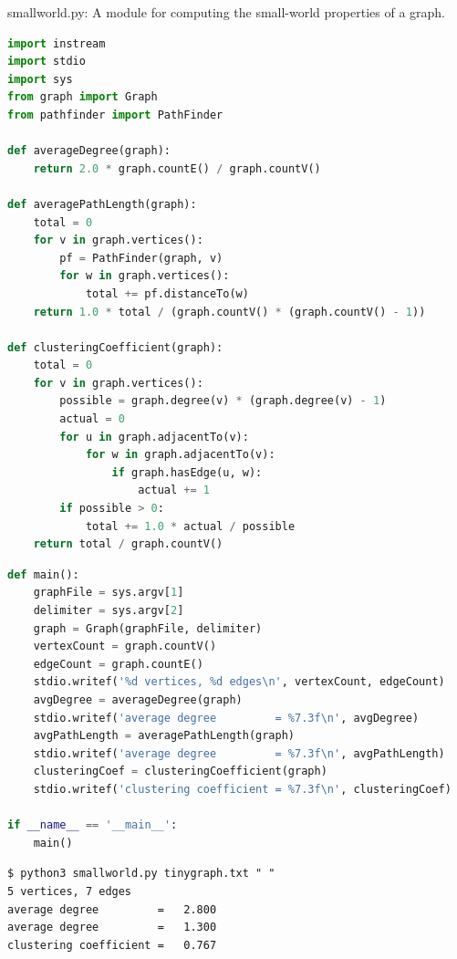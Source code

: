 \documentclass[8pt,a4paper,compress]{beamer}
\begin{document}
\begin{frame}[fragile]
\pause

\begin{framed}
\tiny smallworld.py: A module for computing the small-world properties of a graph.
\end{framed}

\begin{lstlisting}[language=python,style=focusin]
import instream
import stdio
import sys
from graph import Graph
from pathfinder import PathFinder

def averageDegree(graph):
    return 2.0 * graph.countE() / graph.countV()

def averagePathLength(graph):
    total = 0
    for v in graph.vertices():
        pf = PathFinder(graph, v)
        for w in graph.vertices():
            total += pf.distanceTo(w)
    return 1.0 * total / (graph.countV() * (graph.countV() - 1))

def clusteringCoefficient(graph):
    total = 0
    for v in graph.vertices():
        possible = graph.degree(v) * (graph.degree(v) - 1)
        actual = 0
        for u in graph.adjacentTo(v):
            for w in graph.adjacentTo(v):
                if graph.hasEdge(u, w):
                    actual += 1
        if possible > 0:
            total += 1.0 * actual / possible
    return total / graph.countV()
\end{lstlisting}
\end{frame}

\begin{frame}[fragile]
\pause

\begin{lstlisting}[language=python,style=focusin]
def main():
    graphFile = sys.argv[1]
    delimiter = sys.argv[2]
    graph = Graph(graphFile, delimiter)
    vertexCount = graph.countV()
    edgeCount = graph.countE()
    stdio.writef('%d vertices, %d edges\n', vertexCount, edgeCount)
    avgDegree = averageDegree(graph)
    stdio.writef('average degree         = %7.3f\n', avgDegree)
    avgPathLength = averagePathLength(graph)
    stdio.writef('average degree         = %7.3f\n', avgPathLength)
    clusteringCoef = clusteringCoefficient(graph)
    stdio.writef('clustering coefficient = %7.3f\n', clusteringCoef)

if __name__ == '__main__':
    main()
\end{lstlisting}

\pause

\begin{lstlisting}[language={},style=focusin]
$ python3 smallworld.py tinygraph.txt " "
5 vertices, 7 edges
average degree         =   2.800
average degree         =   1.300
clustering coefficient =   0.767
\end{lstlisting}
\end{frame}
\end{document}
